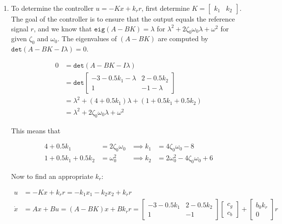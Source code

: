 \documentclass[11pt]{article}
\theoremstyle{definition}
\begin{document}
\begin{enumerate}
\begin{enumerate}
        \item %
        To determine the controller $u = -Kx + k_r r$, first determine $K = \begin{bmatrix} k_1 & k_2 \end{bmatrix}$.  The goal of the controller is to ensure that the output equals the reference signal $r$, and we know that $\mathtt{eig}(A - BK) = \lambda$ for $\lambda^2 + 2 \zeta_0 \omega_0 \lambda + \omega^2$ for given $\zeta_0$ and $\omega_0$.  The eigenvalues of $(A - BK)$ are computed by $\mathtt{det}(A-BK - I\lambda) = 0$.

        \begin{align*}
            0 &= \mathtt{det}(A-BK - I\lambda) \\
            &= \mathtt{det}\begin{bmatrix} -3 -0.5k_1 - \lambda & 2 - 0.5k_2 \\ 1 & -1 -\lambda \end{bmatrix} \\
            &= \lambda^2 + (4 + 0.5k_1) \lambda + (1 + 0.5k_1 + 0.5k_2) \\
            &= \lambda^2 + 2 \zeta_0 \omega_0 \lambda + \omega^2
        \end{align*}

        This means that

        \begin{align*}
            4 + 0.5k_1 &= 2 \zeta_0 \omega_0 &\implies k_1 &= 4 \zeta_0 \omega_0 - 8\\
            1+ 0.5k_1 + 0.5k_2 &= \omega_0^2 &\implies k_2 &= 2 \omega_0^2 -4 \zeta_0 \omega_0 + 6
        \end{align*}

        Now to find an appropriate $k_r$:

        \begin{align*}
            u &= -Kx + k_r r = -k_1 x_1 - k_2 x_2 + k_r r \\
            \dot{x} &= Ax + Bu = (A - BK)x + B k_r r = \begin{bmatrix} -3 -0.5k_1 & 2 -0.5k_2 \\ 1 & -1 \end{bmatrix} \begin{bmatrix} c_g \\ c_b \end{bmatrix} + \begin{bmatrix} b_0 k_r \\ 0 \end{bmatrix} r
        \end{align*}


\end{enumerate}
\end{enumerate}
\end{document}
